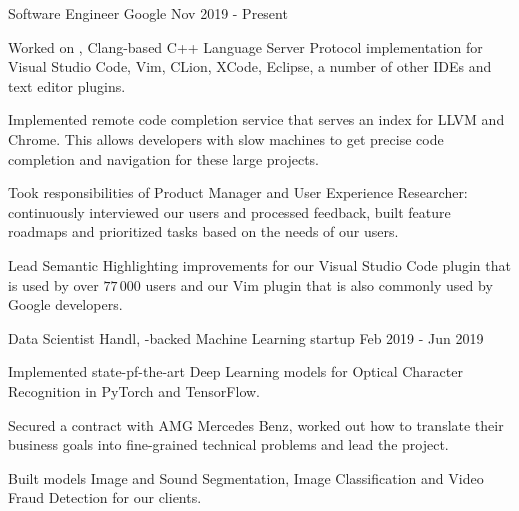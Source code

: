 
\begin{cventries}

  \cventry
    {Software Engineer}
    {Google}
    {}
    {Nov 2019 - Present}
    {
      \begin{cvitems}
        \item Worked on , Clang-based
          C++ Language Server Protocol implementation for Visual Studio Code,
          Vim, CLion, XCode, Eclipse, a number of other IDEs and text editor
          plugins.
        \item Implemented remote code completion service that serves an index for
          LLVM and Chrome. This allows developers with slow machines to get
          precise code completion and navigation for these large projects.
        \item Took responsibilities of Product Manager and User Experience
          Researcher: continuously interviewed our users and processed feedback,
          built feature roadmaps and prioritized tasks based on the needs of our
          users.
        \item Lead Semantic Highlighting improvements for our Visual Studio Code
          plugin that is used by over $77\,000$ users and our Vim plugin that is
          also commonly used by Google developers.
      \end{cvitems}
    }

  \cventry
    {Data Scientist}
    {Handl, -backed Machine
     Learning startup}
    {}
    {Feb 2019 - Jun 2019}
    {
      \begin{cvitems}
        \item Implemented state-pf-the-art Deep Learning models for Optical
          Character Recognition in PyTorch and TensorFlow.
        \item Secured a contract with AMG Mercedes Benz, worked out how to
          translate their business goals into fine-grained technical problems
          and lead the project.
        \item Built models Image and Sound Segmentation, Image Classification
        and Video Fraud Detection for our clients.
      \end{cvitems}
    }


\end{cventries}
